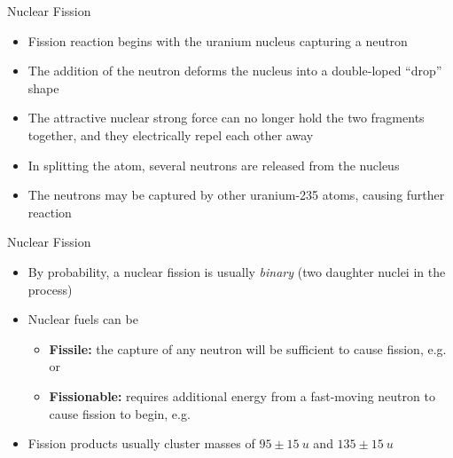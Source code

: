 \documentclass[12pt,compress,aspectratio=169]{beamer}
\begin{document}
\begin{frame}{Nuclear Fission}
  \begin{center}
  \end{center}
  \begin{itemize}
  \item\vspace{-.25in}Fission reaction begins with the uranium nucleus
    capturing a neutron
  \item The addition of the neutron deforms the nucleus into a double-loped
    ``drop'' shape
  \item The attractive nuclear strong force can no longer hold the two fragments
    together, and they electrically repel each other away
  \item In splitting the atom, several neutrons are released from the nucleus
  \item The neutrons may be captured by other uranium-235 atoms, causing further
    reaction
  \end{itemize}
\end{frame}



\begin{frame}{Nuclear Fission}
  \begin{itemize}
  \item By probability, a nuclear fission is usually \emph{binary} (two
    daughter nuclei in the process)
  \item Nuclear fuels can be
    \begin{itemize}
    \item\textbf{Fissile:} the capture of any neutron will be sufficient to
      cause fission, e.g.\  or 
    \item\textbf{Fissionable:} requires additional energy from a fast-moving
      neutron to cause fission to begin, e.g.\ 
    \end{itemize}
  \item Fission products usually cluster masses of $95\pm\SI{15}{u}$ and
    $135\pm\SI{15}{u}$
  \end{itemize}
\end{frame}
\end{document}
